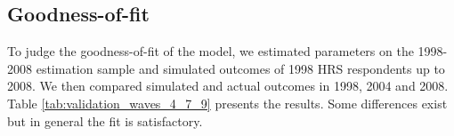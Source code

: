 \subsection{Goodness-of-fit}
To judge the goodness-of-fit of the model, we estimated parameters on the 1998-2008 estimation sample and simulated outcomes of 1998 HRS 
respondents up to 2008. We then compared simulated and actual outcomes in 1998, 2004 and 2008. Table \ref{tab:validation_waves_4_7_9} presents the results. Some 
differences exist but in general the fit is satisfactory.

%
